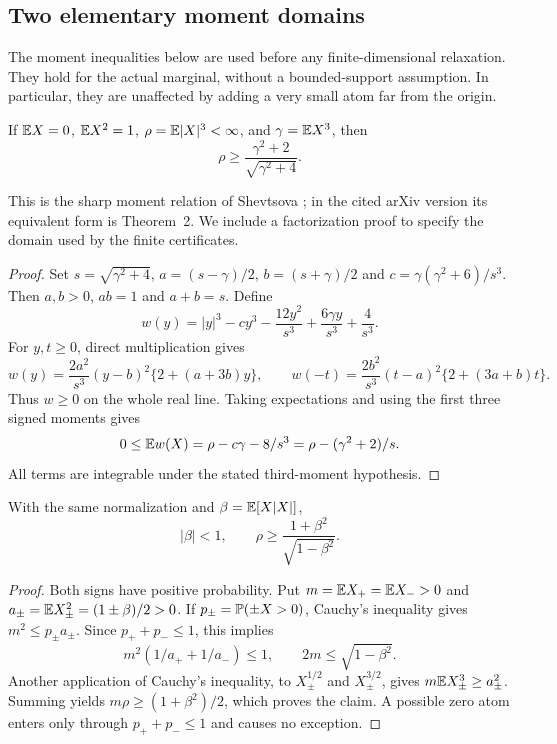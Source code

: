 \subsection{Two elementary moment domains}\label{ms:moment-domain}

The moment inequalities below are used before any finite-dimensional
relaxation. They hold for the actual marginal, without a bounded-support
assumption. In particular, they are unaffected by adding a very small
atom far from the origin.

\begin{theorem}\label{ms:sharp-third}
If $\mathbb E X=0$, $\mathbb E X^2=1$, $\rho=\mathbb E|X|^3<\infty$, and
$\gamma=\mathbb E X^3$, then
\[
 \rho\ge\frac{\gamma^2+2}{\sqrt{\gamma^2+4}}.
\]
\end{theorem}
This is the sharp moment relation of Shevtsova
\cite{shevtsova2014complex}; in the cited arXiv version its equivalent
form is Theorem~2. We include a factorization proof to specify the
domain used by the finite certificates.
\begin{proof}
Set $s=\sqrt{\gamma^2+4}$, $a=(s-\gamma)/2$, $b=(s+\gamma)/2$ and
$c=\gamma(\gamma^2+6)/s^3$. Then $a,b>0$, $ab=1$ and $a+b=s$.
Define
\[
 w(y)=|y|^3-cy^3-\frac{12y^2}{s^3}
                          +\frac{6\gamma y}{s^3}+\frac4{s^3}.
\]
For $y,t\ge0$, direct multiplication gives
\[
 w(y)=\frac{2a^2}{s^3}(y-b)^2\{2+(a+3b)y\},\qquad
 w(-t)=\frac{2b^2}{s^3}(t-a)^2\{2+(3a+b)t\}.
\]
Thus $w\ge0$ on the whole real line. Taking expectations and using the
first three signed moments gives
\[
 0\le\mathbb E w(X)=\rho-c\gamma-8/s^3
            =\rho-(\gamma^2+2)/s.
\]
All terms are integrable under the stated third-moment hypothesis.
\end{proof}

\begin{lemma}\label{ms:sign-moment}
With the same normalization and $\beta=\mathbb E[X|X|]$,
\[
 |\beta|<1,\qquad
 \rho\ge\frac{1+\beta^2}{\sqrt{1-\beta^2}}.
\]
\end{lemma}
\begin{proof}
Both signs have positive probability. Put
$m=\mathbb E X_+=\mathbb E X_->0$ and $a_\pm=\mathbb E X_\pm^2=(1\pm\beta)/2>0$.
If $p_\pm=\mathbb P(\pm X>0)$, Cauchy's inequality gives
$m^2\le p_\pm a_\pm$. Since $p_++p_-\le1$, this implies
\[
 m^2(1/a_++1/a_-)\le1,
 \qquad 2m\le\sqrt{1-\beta^2}.
\]
Another application of Cauchy's inequality, to
$X_\pm^{1/2}$ and $X_\pm^{3/2}$, gives
$m\mathbb E X_\pm^3\ge a_\pm^2$. Summing yields
$m\rho\ge(1+\beta^2)/2$, which proves the claim. A possible zero atom
enters only through $p_++p_-\le1$ and causes no exception.
\end{proof}
